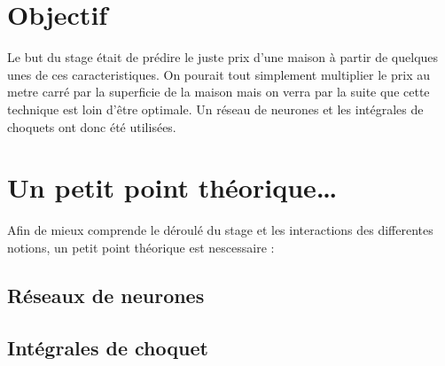 
\section{Objectif}
\label{sec:obj}

Le but du stage était de prédire le juste prix d'une maison à partir de quelques unes de ces caracteristiques.
On pourait tout simplement multiplier le prix au metre carré par la superficie de la maison
mais on verra par la suite que cette technique est loin d'être optimale.
Un réseau de neurones et les intégrales de choquets ont donc été utilisées.

\section{Un petit point théorique\ldots}
\label{sec:th}
Afin de mieux comprende le déroulé du stage et les interactions des differentes notions,
un petit point théorique est nescessaire :

\subsection{Réseaux de neurones}\label{subsec:réseau-de-neurones}


\newpage


\subsection{Intégrales de choquet}\label{subsec:intégrales-de-choquet}

